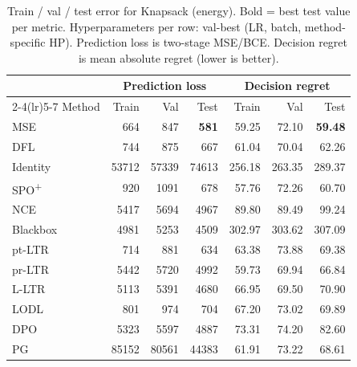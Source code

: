 \begin{table}[h]
\centering
\caption[Train/val/test error for Knapsack (energy).]{Train / val / test error for Knapsack (energy). Bold = best test value per metric. Hyperparameters per row: val-best (LR, batch, method-specific HP). Prediction loss is two-stage MSE/BCE. Decision regret is mean absolute regret (lower is better).}
\label{tab:err-knapsack-real}
\setlength{\tabcolsep}{4pt}
\renewcommand{\arraystretch}{1.05}
\begin{tabular}{@{}lrrrrrr@{}}
\toprule
& \multicolumn{3}{c}{Prediction loss} & \multicolumn{3}{c}{Decision regret} \\
\cmidrule(lr){2-4}\cmidrule(lr){5-7}
Method & Train & Val & Test & Train & Val & Test \\
\midrule
MSE & 664 & 847 & \textbf{581} & 59.25 & 72.10 & \textbf{59.48} \\
DFL & 744 & 875 & 667 & 61.04 & 70.04 & 62.26 \\
Identity & 53712 & 57339 & 74613 & 256.18 & 263.35 & 289.37 \\
SPO\textsuperscript{+} & 920 & 1091 & 678 & 57.76 & 72.26 & 60.70 \\
NCE & 5417 & 5694 & 4967 & 89.80 & 89.49 & 99.24 \\
Blackbox & 4981 & 5253 & 4509 & 302.97 & 303.62 & 307.09 \\
pt-LTR & 714 & 881 & 634 & 63.38 & 73.88 & 69.38 \\
pr-LTR & 5442 & 5720 & 4992 & 59.73 & 69.94 & 66.84 \\
L-LTR & 5113 & 5391 & 4680 & 66.95 & 69.50 & 70.90 \\
LODL & 801 & 974 & 704 & 67.20 & 73.02 & 69.89 \\
DPO & 5323 & 5597 & 4887 & 73.31 & 74.20 & 82.60 \\
PG & 85152 & 80561 & 44383 & 61.91 & 73.22 & 68.61 \\
\bottomrule
\end{tabular}
\end{table}

